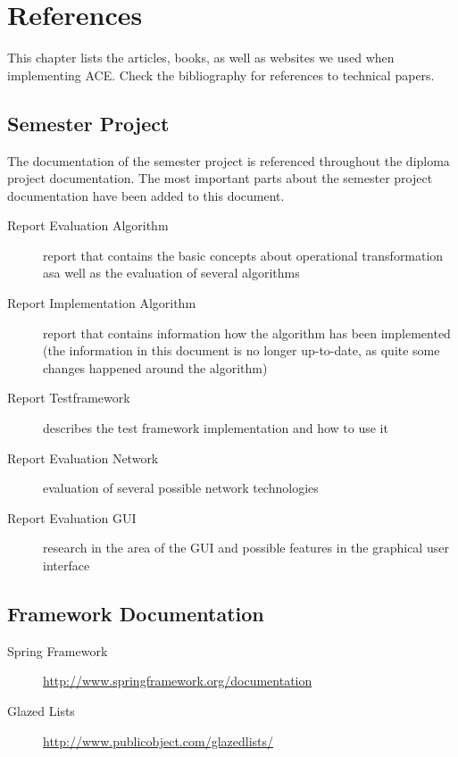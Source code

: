 \chapter{References}
\label{chapter:references}

This chapter lists the articles, books, as well as websites we used when
implementing ACE. Check the bibliography for references to technical
papers.


\section{Semester Project}
The documentation of the semester project is referenced throughout the
diploma project documentation. The most important parts about the 
semester project documentation have been added to this document.

\begin{description}
 \item[Report Evaluation Algorithm] report that contains the basic concepts about operational transformation asa well as the evaluation of several algorithms
 \item[Report Implementation Algorithm] report that contains information how the algorithm has been implemented (the information in this document is no longer up-to-date, as quite some changes happened around the algorithm)
 \item[Report Testframework] describes the test framework implementation and how to use it
 \item[Report Evaluation Network] evaluation of several possible network technologies
 \item[Report Evaluation GUI] research in the area of the GUI and possible features in the graphical user interface
\end{description}



\section{Framework Documentation}

\begin{description}
 \item[Spring Framework] \href{http://www.springframework.org/documentation}{http://www.springframework.org/documentation}
 \item[Glazed Lists] \href{http://www.publicobject.com/glazedlists/}{http://www.publicobject.com/glazedlists/}
\end{description}

